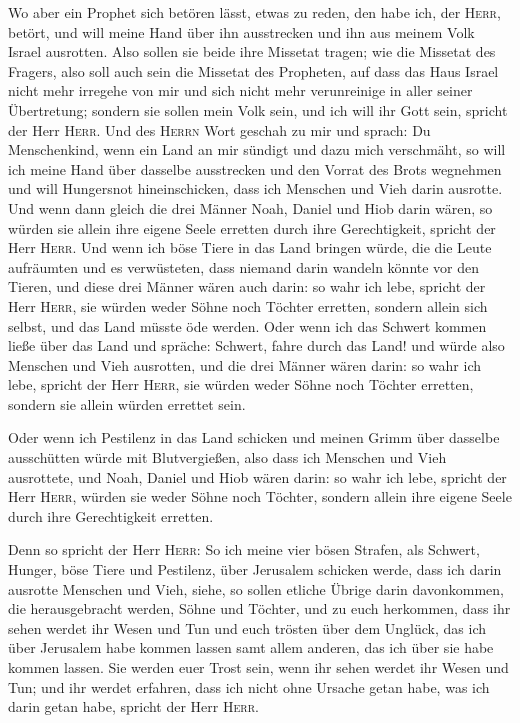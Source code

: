  Wo aber ein Prophet sich betören lässt, etwas zu reden,
den habe ich, der \textsc{Herr}, betört, und will meine Hand über ihn
ausstrecken und ihn aus meinem Volk Israel ausrotten. 
Also sollen sie beide ihre Missetat tragen; wie die Missetat des
Fragers, also soll auch sein die Missetat des Propheten, 
auf dass das Haus Israel nicht mehr irregehe von mir und sich nicht mehr
verunreinige in aller seiner Übertretung; sondern sie sollen mein Volk
sein, und ich will ihr Gott sein, spricht der Herr \textsc{Herr}.
 Und des \textsc{Herrn} Wort geschah zu mir und sprach:
 Du Menschenkind, wenn ein Land an mir sündigt und dazu
mich verschmäht, so will ich meine Hand über dasselbe ausstrecken und
den Vorrat des Brots wegnehmen und will Hungersnot hineinschicken, dass
ich Menschen und Vieh darin ausrotte.  Und wenn dann
gleich die drei Männer Noah, Daniel und Hiob darin wären, so würden sie
allein ihre eigene Seele erretten durch ihre Gerechtigkeit, spricht der
Herr \textsc{Herr}.  Und wenn ich böse Tiere in das Land
bringen würde, die die Leute aufräumten und es verwüsteten, dass niemand
darin wandeln könnte vor den Tieren,  und diese drei
Männer wären auch darin: so wahr ich lebe, spricht der Herr
\textsc{Herr}, sie würden weder Söhne noch Töchter erretten, sondern
allein sich selbst, und das Land müsste öde werden.  Oder
wenn ich das Schwert kommen ließe über das Land und spräche: Schwert,
fahre durch das Land! und würde also Menschen und Vieh ausrotten,
 und die drei Männer wären darin: so wahr ich lebe,
spricht der Herr \textsc{Herr}, sie würden weder Söhne noch Töchter
erretten, sondern sie allein würden errettet sein.

 Oder wenn ich Pestilenz in das Land schicken und meinen
Grimm über dasselbe ausschütten würde mit Blutvergießen, also dass ich
Menschen und Vieh ausrottete,  und Noah, Daniel und Hiob
wären darin: so wahr ich lebe, spricht der Herr \textsc{Herr}, würden
sie weder Söhne noch Töchter, sondern allein ihre eigene Seele durch
ihre Gerechtigkeit erretten.

 Denn so spricht der Herr \textsc{Herr}: So ich meine
vier bösen Strafen, als Schwert, Hunger, böse Tiere und Pestilenz, über
Jerusalem schicken werde, dass ich darin ausrotte Menschen und Vieh,
 siehe, so sollen etliche Übrige darin davonkommen, die
herausgebracht werden, Söhne und Töchter, und zu euch herkommen, dass
ihr sehen werdet ihr Wesen und Tun und euch trösten über dem Unglück,
das ich über Jerusalem habe kommen lassen samt allem anderen, das ich
über sie habe kommen lassen.  Sie werden euer Trost sein,
wenn ihr sehen werdet ihr Wesen und Tun; und ihr werdet erfahren, dass
ich nicht ohne Ursache getan habe, was ich darin getan habe, spricht der
Herr \textsc{Herr}.

